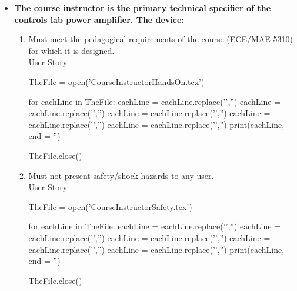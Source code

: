 \begin{itemize}
	\item  {\textbf{The course instructor is the primary technical specifier of the controls lab power amplifier.  The device:}}
	\begin{enumerate}
		\item Must meet the pedagogical requirements of the course (ECE/MAE 5310) for which it is designed.\\[.5cm] \underline{User Story} \\
		
\bigskip		
		
\begin{python}
TheFile = open('CourseInstructorHandsOn.tex')

for eachLine in TheFile:
    eachLine = eachLine.replace('','')
    eachLine = eachLine.replace('','')
    eachLine = eachLine.replace('','')
    eachLine = eachLine.replace('','')
    eachLine = eachLine.replace('','')
    print(eachLine, end = '')
		
TheFile.close()
\end{python}
		
		       
\bigskip

		  
		\item Must not present safety/shock hazards to any user.\\[.5cm] \underline{User Story} \\ 
		
\begin{python}
TheFile = open('CourseInstructorSafety.tex')

for eachLine in TheFile:
    eachLine = eachLine.replace('','')
    eachLine = eachLine.replace('','')
    eachLine = eachLine.replace('','')
    eachLine = eachLine.replace('','')
    eachLine = eachLine.replace('','')
    print(eachLine, end = '')
		
TheFile.close()
\end{python}
		       
		



\end{enumerate}
\end{itemize}
